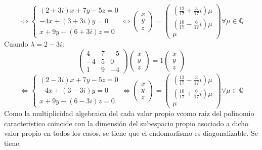 \documentclass{article}
\begin{document}
$$
\Leftrightarrow \left\{ \begin{array}{c}
     (2+3i)x+7y-5z =0  \\
     -4x+(3+3i)y =0  \\
     x+9y-(6+3i)z =0
\end{array} \right.
\Leftrightarrow \left( \begin{array}{c}
      x \\
      y \\
      z
\end{array} \right) =
\left( \begin{array}{c}
      (\frac{12}{17}+\frac{3}{17}i)\mu \\
      (\frac{10}{17}-\frac{6}{17}i)\mu \\
      \mu
\end{array} \right) \forall \mu \in \mathbb{Q}
$$
Cuando $\lambda=2-3i$:
$$
\left( \begin{array}{ccc}
    4 & 7 & -5\\
    -4 & 5 & 0\\
    1 & 9 & -4
\end{array} \right)
\left( \begin{array}{c}
      x \\
      y \\
      z
\end{array} \right) = 1
\left( \begin{array}{c}
      x \\
      y \\
      z
\end{array} \right)
$$
$$
\Leftrightarrow \left\{ \begin{array}{c}
     (2-3i)x+7y-5z =0  \\
     -4x+(3-3i)y =0  \\
     x+9y-(6-3i)z =0
\end{array} \right.
\Leftrightarrow \left( \begin{array}{c}
      x \\
      y \\
      z
\end{array} \right) =
\left( \begin{array}{c}
      (\frac{12}{17}-\frac{3}{17}i)\mu \\
      (\frac{10}{17}+\frac{6}{17}i)\mu \\
      \mu
\end{array} \right) \forall \mu \in \mathbb{Q}
$$
Como la multiplicidad algebraica del cada valor propio vcomo raiz del polinomio caracteristico coincide con la dimensión del subespacio propio asociado a dicho valor propio en todos los casos, se tiene que el endomorfismo es diagonalizable. Se tiene:
\end{document}
